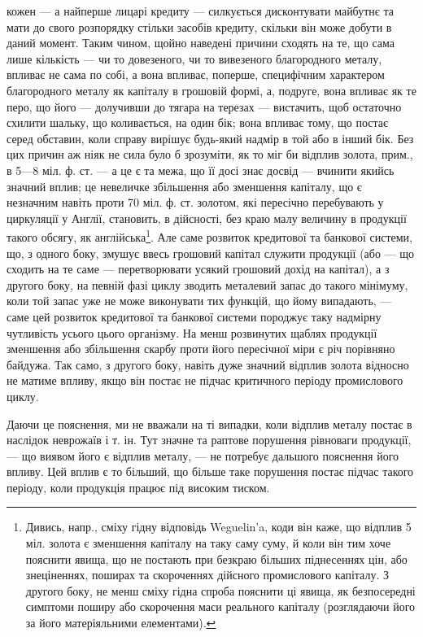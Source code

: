 кожен — а найперше лицарі кредиту — силкується дисконтувати майбутнє та
мати до свого розпорядку стільки засобів кредиту, скільки він може добути в
даний момент. Таким чином, щойно наведені причини сходять на те, що сама
лише кількість — чи то довезеного, чи то вивезеного благородного металу, впливає
не сама по собі, а вона впливає, поперше, специфічним характером благородного
металу як капіталу в грошовій формі, а, подруге, вона впливає як те перо,
що його — долучивши до тягара на терезах — вистачить, щоб остаточно схилити
шальку, що коливається, на один бік; вона впливає тому, що постає серед
обставин, коли справу вирішує будь-який надмір в той або в інший бік. Без цих
причин аж ніяк не сила було б зрозуміти, як то міг би відплив золота, прим.,
в 5—8 міл. ф. ст. — а це є та межа, що її досі знає досвід — вчинити якийсь
значний вплив; це невеличке збільшення або зменшення капіталу, що є незначним
навіть проти 70 міл. ф. ст. золотом, які пересічно перебувають у циркуляції
у Англії, становить, в дійсності, без краю малу величину в продукції такого
обсягу, як англійська\footnote{
Дивись, напр., сміху гідну відповідь Weguelin’a, коди він каже, що відплив 5 міл. золота
є зменшення капіталу на таку саму суму, й коли він тим хоче пояснити явища, що не постають при
безкраю
більших піднесеннях цін, або знеціненнях, поширах та скороченнях дійсного промислового капіталу.
З другого боку, не менш сміху гідна спроба пояснити ці явища, як безпосередні симптоми поширу або
скорочення маси реального капіталу (розглядаючи його за його матеріяльними елементами).
}. Але саме розвиток кредитової та банкової системи, що,
з одного боку, змушує ввесь грошовий капітал служити продукції (або — що
сходить на те саме — перетворювати усякий грошовий дохід на капітал), а з
другого боку, на певній фазі циклу зводить металевий запас до такого мінімуму,
коли той запас уже не може виконувати тих функцій, що йому випадають, —
саме цей розвиток кредитової та банкової системи породжує таку надмірну чутливість
усього цього організму. На менш розвинутих щаблях продукції зменшення
або збільшення скарбу проти його пересічної міри є річ порівняно байдужа.
Так само, з другого боку, навіть дуже значний відплив золота відносно
не матиме впливу, якщо він постає не підчас критичного періоду промислового
циклу.

Даючи це пояснення, ми не вважали на ті випадки, коли відплив металу
постає в наслідок неврожаїв і т. ін. Тут значне та раптове порушення рівноваги
продукції, — що виявом його є відплив металу, — не потребує дальшого пояснення
його впливу. Цей вплив є то більший, що більше таке порушення постає
підчас такого періоду, коли продукція працює під високим тиском.

